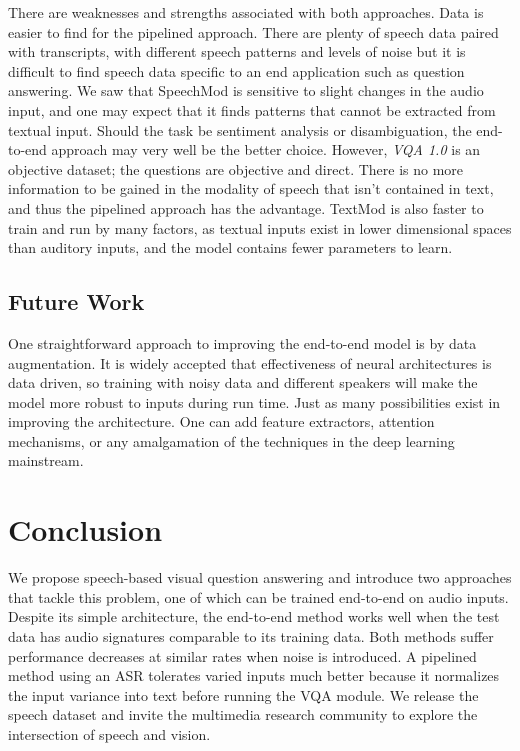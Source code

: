 \documentclass[letterpaper]{article} %
\begin{document}
There are weaknesses and strengths associated with both approaches. Data is easier to find for the pipelined approach. There are plenty of speech data paired with transcripts, with different speech patterns and levels of noise but it is difficult to find speech data specific to an end application such as question answering. We saw that SpeechMod is sensitive to slight changes in the audio input, and one may expect that it finds patterns that cannot be extracted from textual input. Should the task be sentiment analysis or disambiguation, the end-to-end approach may very well be the better choice. However, \textit{VQA 1.0} is an objective dataset; the questions are objective and direct. There is no more information to be gained in the modality of speech that isn't contained in text, and thus the pipelined approach has the advantage. TextMod is also faster to train and run by many factors, as textual inputs exist in lower dimensional spaces than auditory inputs, and the model contains fewer parameters to learn.


\subsection{Future Work}

One straightforward approach to improving the end-to-end model is by data augmentation. It is widely accepted that effectiveness of neural architectures is data driven, so training with noisy data and different speakers will make the model more robust to inputs during run time. Just as many possibilities exist in improving the architecture. One can add feature extractors, attention mechanisms, or any amalgamation of the techniques in the deep learning mainstream.

\section{Conclusion}
\label{sec:conclusion}

We propose speech-based visual question answering and introduce two approaches that tackle this problem, one of which can be trained end-to-end on audio inputs. Despite its simple architecture, the end-to-end method works well when the test data has audio signatures comparable to its training data. Both methods suffer performance decreases at similar rates when noise is introduced. A pipelined method using an ASR tolerates varied inputs much better because it normalizes the input variance into text before running the VQA module. We release the speech dataset and invite the multimedia research community to explore the intersection of speech and vision.


 
\end{document}
